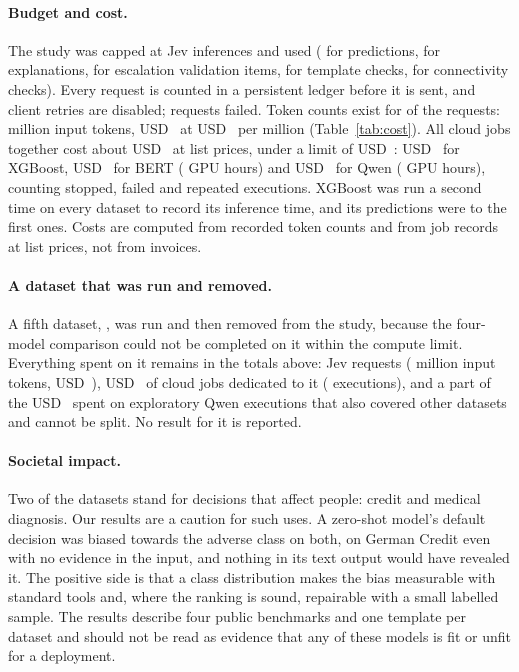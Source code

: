 \paragraph{Budget and cost.}
The study was capped at \JevCap{} Jev inferences and used \JevInferencesUsed{}
(\JevRequestsPredict{} for predictions, \JevRequestsExplain{} for explanations,
\JevRequestsEscalationVal{} for escalation validation items, \JevRequestsTemplate{} for template
checks, \JevRequestsSmoke{} for connectivity checks). Every request is counted in a persistent
ledger before it is sent, and client retries are disabled; \JevFailedRequests{} requests failed.
Token counts exist for \JevRequestsWithTokens{} of the requests: \JevInputTokensM{} million input
tokens, USD~\JevCostUSD{} at USD~\JevPricePerMTok{} per million (Table~\ref{tab:cost}). All cloud
jobs together cost about USD~\AwsCostTotalUSD{} at list prices, under a limit of
USD~\AwsSpendLimit: USD~\AwsCostUSDXgb{} for XGBoost, USD~\AwsCostUSDBert{} for BERT
(\AwsGpuHoursBert{} GPU hours) and USD~\AwsCostUSDQwen{} for Qwen (\AwsGpuHoursQwen{} GPU hours),
counting stopped, failed and repeated executions. XGBoost was run a second time on every dataset
to record its inference time, and its predictions were \XgbRerunPredictions{} to the first ones.
Costs are computed from recorded token counts and from job records at list prices, not from
invoices.

\paragraph{A dataset that was run and removed.}
A fifth dataset, \RemovedDataset, was run and then removed from the study, because the
four-model comparison could not be completed on it within the compute limit. Everything spent on
it remains in the totals above: \RemovedJevRequests{} Jev requests (\RemovedJevTokensM{} million
input tokens, USD~\RemovedJevUSD), USD~\RemovedAwsDedicatedUSD{} of cloud jobs dedicated to it
(\RemovedAwsDedicatedExecutions{} executions), and a part of the USD~\RemovedAwsSharedUSD{} spent
on \RemovedAwsSharedExecutions{} exploratory Qwen executions that also covered other datasets and
cannot be split. No result for it is reported.

\paragraph{Societal impact.}
Two of the datasets stand for decisions that affect people: credit and medical diagnosis. Our
results are a caution for such uses. A zero-shot model's default decision was biased towards the
adverse class on both, on German Credit even with no evidence in the input, and nothing in its
text output would have revealed it. The positive side is that a class distribution makes the
bias measurable with standard tools and, where the ranking is sound, repairable with a small
labelled sample. The results describe four public benchmarks and one template per dataset and
should not be read as evidence that any of these models is fit or unfit for a deployment.

